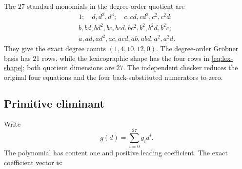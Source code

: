 The \(27\) standard monomials in the degree-order quotient are
\begin{equation}
\begin{gathered}
1;\quad d,d^2,d^3;\quad c,cd,cd^2,c^2,c^2d;\\
b,bd,bd^2,bc,bcd,bc^2,b^2,b^2d,b^2c;\\
a,ad,ad^2,ac,acd,ab,abd,a^2,a^2d.
\end{gathered}
\label{eq:standard-monomials}
\end{equation}
They give the exact degree counts \((1,4,10,12,0)\).  The degree-order
Gr\"obner basis has \(21\) rows, while the lexicographic shape has the four
rows in \cref{eq:lex-shape}; both quotient dimensions are \(27\).  The
independent checker reduces the original four equations and the four
back-substituted numerators to zero.

\subsection{Primitive eliminant}

Write
\[
 g(d)=\sum_{i=0}^{27}g_i d^i.
\]
The polynomial has content one and positive leading coefficient.  The exact
coefficient vector is:

